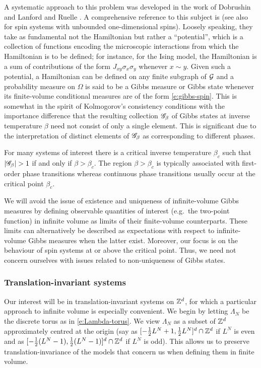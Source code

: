 A systematic approach to this problem was developed in the work of Dobrushin \cite{Dobrushin68}
and Lanford and Ruelle \cite{LR69}. A comprehensive reference to this subject is \cite{Georgii11}
(see also \cite{LP76} for spin systems with unbounded one-dimensional spins).
Loosely speaking, they take as fundamental not the Hamiltonian
but rather a ``potential'', which is a collection of functions encoding the microscopic interactions
from which the Hamiltonian is to be defined; for instance, for the Ising model,
the Hamiltonian is a sum of contributions of the form $J_{xy} \sigma_x \sigma_y$ whenever
$x \sim y$. Given such a potential, a Hamiltonian can be defined on any
finite subgraph of $\mathcal{G}$ and a probability measure on $\Omega$ is said to be a Gibbs
measure or Gibbs state whenever its finite-volume conditional measures are of the form \eqref{e:gibbs-spin}.
This is somewhat in the spirit of Kolmogorov's consistency conditions with the importance
difference that the resulting collection $\mathscr{G}_\beta$ of Gibbs states at inverse temperature
$\beta$ need not consist of only a single element. This is significant due to the interpretation
of distinct elements of $\mathscr{G}_\beta$ as corresponding to different phases.

For many systems of interest there is a critical inverse temperature $\beta_c$ such that
$|\mathscr{G}_\beta| > 1$ if and only if $\beta > \beta_c$. The region $\beta > \beta_c$ is typically
associated with first-order phase transitions whereas continuous phase transitions usually occur
at the critical point $\beta_c$.

We will avoid the issue of existence and uniqueness of infinite-volume Gibbs
measures
by defining observable quantities of interest (e.g.\ the two-point function) in infinite
volume as limits of their finite-volume counterparts. These limits can alternatively be
described as expectations with respect to infinite-volume Gibbs measures when the latter
exist. Moreover, our focus is on the behaviour of spin systems at or above the critical
point. Thus, we need not concern ourselves with issues related to non-uniqueness of Gibbs
states.

\subsubsection{Translation-invariant systems}

Our interest will be in translation-invariant systems on ${ {{\mathbb Z}}^d }$, for which a particular
approach to infinite volume is especially convenient. We begin by letting $\Lambda_N$
be the discrete torus as in \eqref{e:Lambda-torus}. We view $\Lambda_N$
as a subset of ${ {{\mathbb Z}}^d }$ approximately centred at the origin (say as
$[-\frac12 L^N+1,\frac12 L^N]^d \cap {\mathbb Z}^d$ if $L^N$ is even
and as $[-\frac12 (L^N-1), \frac12 (L^N-1)]^d \cap {\mathbb Z}^d$ if $L^N$ is odd). This allows us to preserve
translation-invariance of the models that concern us when defining them in finite volume.

